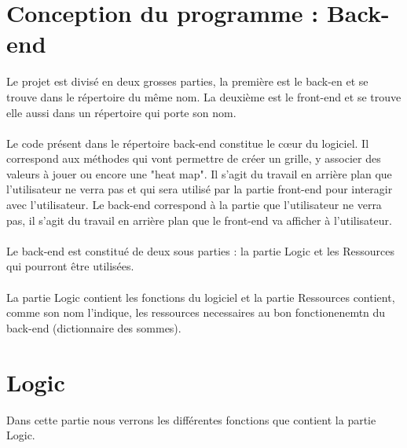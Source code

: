 \documentclass[12pt]{article}
\begin{document}
\section{Conception du programme : Back-end}
Le projet est divisé en deux grosses parties, la première est le back-en et se trouve dans le répertoire du même nom. La deuxième est le front-end et se trouve elle aussi dans un répertoire qui porte son nom.
\\ \\
Le code présent dans le répertoire back-end constitue le cœur du logiciel. Il correspond aux méthodes qui vont permettre de créer un grille, y associer des valeurs à jouer ou  encore une "heat map". Il s'agit du travail en arrière plan que l'utilisateur ne verra pas et qui sera utilisé par la partie front-end pour interagir avec l'utilisateur.
Le back-end correspond à la partie que l'utilisateur ne verra pas, il s'agit du travail en arrière plan que le front-end va afficher à l'utilisateur. \\ \\ 
Le back-end est constitué de deux sous parties : la partie Logic et les Ressources qui pourront être utilisées. \\ \\
La partie Logic contient les fonctions du logiciel et la partie Ressources contient, comme son nom l'indique, les ressources necessaires au bon fonctionenemtn du back-end (dictionnaire des sommes).
\section{Logic}
Dans cette partie nous verrons les différentes fonctions que contient la partie Logic. 
\end{document}

